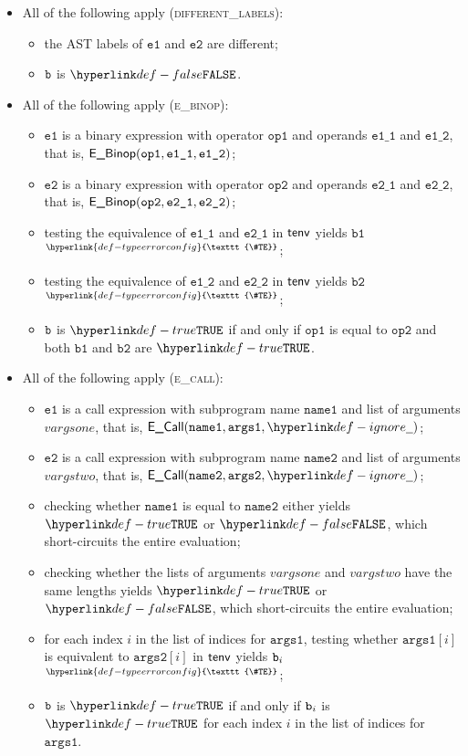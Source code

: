 \documentclass{book}
\newcommand\TypeErrorConfig[0]{\hyperlink{def-typeerrorconfig}{\texttt{\#TE}}}
\newcommand\ProseOrTypeError[0]{\hyperlink{def-proseortypeerror}{$^{\TypeErrorConfig}$}}
\newcommand\veone[0]{\texttt{e1}}
\newcommand\vetwo[0]{\texttt{e2}}
\newcommand\opone[0]{\texttt{op1}}
\newcommand\optwo[0]{\texttt{op2}}
\newcommand\veoneone[0]{\texttt{e1\_1}}
\newcommand\veonetwo[0]{\texttt{e1\_2}}
\newcommand\vetwoone[0]{\texttt{e2\_1}}
\newcommand\vetwotwo[0]{\texttt{e2\_2}}
\newcommand\vbone[0]{\texttt{b1}}
\newcommand\vbtwo[0]{\texttt{b2}}
\newcommand\nameone[0]{\texttt{name1}}
\newcommand\nametwo[0]{\texttt{name2}}
\newcommand\vargsone[0]{\texttt{args1}}
\newcommand\vargstwo[0]{\texttt{args2}}
\begin{document}
\begin{itemize}
  \item All of the following apply (\textsc{different\_labels}):
  \begin{itemize}
    \item the AST labels of $\veone$ and $\vetwo$ are different;
    \item $\texttt{b}$ is $\False$.
  \end{itemize}

  \item All of the following apply (\textsc{e\_binop}):
  \begin{itemize}
    \item $\veone$ is a binary expression with operator $\opone$ and operands $\veoneone$ and $\veonetwo$,
          that is, $\EBinop(\opone, \veoneone, \veonetwo)$;
    \item $\vetwo$ is a binary expression with operator $\optwo$ and operands $\vetwoone$ and $\vetwotwo$,
          that is, $\EBinop(\optwo, \vetwoone, \vetwotwo)$;
    \item testing the equivalence of $\veoneone$ and $\vetwoone$ in $\textsf{tenv}$ yields $\vbone$ \ProseOrTypeError;
    \item testing the equivalence of $\veonetwo$ and $\vetwotwo$ in $\textsf{tenv}$ yields $\vbtwo$ \ProseOrTypeError;
    \item $\texttt{b}$ is $\True$ if and only if $\opone$ is equal to $\optwo$ and both $\vbone$ and $\vbtwo$ are $\True$.
  \end{itemize}

  \item All of the following apply (\textsc{e\_call}):
  \begin{itemize}
    \item $\veone$ is a call expression with subprogram name $\nameone$ and list of arguments $vargsone$,
          that is, $\ECall(\nameone, \vargsone, \Ignore)$;
    \item $\vetwo$ is a call expression with subprogram name $\nametwo$ and list of arguments $vargstwo$,
          that is, $\ECall(\nametwo, \vargstwo, \Ignore)$;
    \item checking whether $\nameone$ is equal to $\nametwo$ either yields $\True$ or $\False$, which short-circuits the entire evaluation;
    \item checking whether the lists of arguments $vargsone$ and $vargstwo$ have the same lengths yields
          $\True$ or $\False$, which short-circuits the entire evaluation;
    \item for each index $i$ in the list of indices for $\vargsone$, testing whether $\vargsone[i]$ is equivalent to $\vargstwo[i]$
          in $\textsf{tenv}$ yields $\texttt{b}_i$ \ProseOrTypeError;
    \item $\texttt{b}$ is $\True$ if and only if $\texttt{b}_i$ is $\True$ for each index $i$ in the list of indices for $\vargsone$.
  \end{itemize}


\end{itemize}
\end{document}
